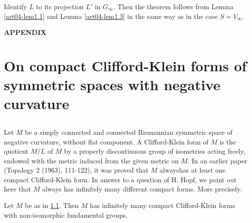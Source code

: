 Identify $L$ to its projection $L'$ in $G_{\infty}$. Then the theorem follows from Lemma \ref{art04-lem1.1} and Lemma \ref{art04-lem1.3} in the same way as in the case $S=V_{\infty}$.

\bigskip
\begin{center}
{\bf APPENDIX}
\end{center}

\section{On compact Clifford-Klein forms of symmetric spaces with negative curvature}\label{art04-sec6}

\subsection{}\label{art04-sec6.1}

Let $M$ be a simply connected and connected Riemannian symmetric space of negative curvature, without flat component. A Clifford-Klein form of $M$ is the quotient $M/L$ of $M$ by a properly discontinuous group of isometries acting freely, endowed with the metric induced from the given metric on $M$. In an earlier paper (Topology 2 (1963), 111-122), it was proved that $M$ always\pageoriginale has at least one compact Clifford-Klein form. In answer to a question of H. Hopf, we point out here that $M$ always has infinitely many different compact forms. More precisely:

\setcounter{theorem}{1}
\begin{theorem}\label{art04-thm6.2}
Let $M$ be as in \ref{art04-sec6.1}. Then $M$ has infinitely many compact Clifford-Klein forms with non-isomorphic fundamental groups.
\end{theorem}

